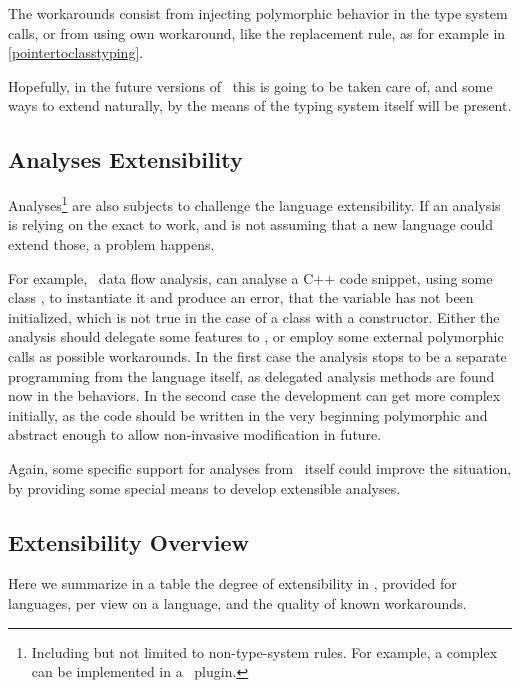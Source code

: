 The workarounds consist from injecting polymorphic behavior in the type system calls, or from using \jbmps own workaround, like 
the replacement rule, as for example in \ref{pointertoclasstyping}.

Hopefully, in the future versions of \jbmps\ this is going to be taken care of, and some ways to extend naturally, by the 
means of the typing system itself will be present.

\subsection{Analyses Extensibility}
\label{analysesext}

Analyses\footnote{Including but not limited to non-type-system rules. For example, a complex  can be implemented in a \jbmps\ plugin.} are also subjects to challenge the language extensibility. If an analysis is relying on the exact 
to work, and is not assuming that a new language could extend those, a problem happens.

For example, \mbdr\ data flow analysis, can analyse a C++ code snippet, using some class , to instantiate it 
and produce an error, that the variable  has not been initialized, which is not true in the case of a class with a constructor.
Either the analysis should delegate some features to , or employ some external polymorphic calls as possible workarounds.
In the first case the analysis stops to be a separate programming from the language itself, as delegated analysis methods are found now
in the  behaviors. In the second case the development can get more complex initially, as the code should be written 
in the very beginning polymorphic and abstract enough to allow non-invasive modification in future.


Again, some specific support for analyses from \jbmps\ itself could improve the situation, by providing some special means 
to develop extensible analyses.


\subsection{Extensibility Overview}

Here we summarize in a table the degree of extensibility in \jbmps, provided for languages, per view on a language,
and the quality of known workarounds.

